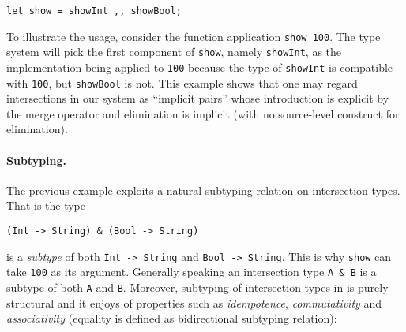 \begin{lstlisting}
let show = showInt ,, showBool;
\end{lstlisting}

To illustrate the usage, consider the function application \lstinline{show 100}.
The type system will pick the first component of \lstinline{show}, namely
\lstinline{showInt}, as the implementation being applied to \lstinline{100}
because the type of \lstinline{showInt} is compatible with \lstinline{100}, but
\lstinline{showBool} is not. This example shows that one may regard
intersections in our system as ``implicit pairs'' whose introduction is explicit
by the merge operator and elimination is implicit (with no source-level
construct for elimination).








\paragraph{Subtyping.} The previous example exploits a natural
subtyping relation on intersection types. That is the type

\begin{lstlisting}
(Int -> String) & (Bool -> String) 
\end{lstlisting}

\noindent is a \emph{subtype} of both \lstinline{Int -> String} and
\lstinline{Bool -> String}. This is why \lstinline{show} can take
\lstinline{100} as its argument. Generally speaking an intersection type
\lstinline{A & B} is a subtype of both \lstinline{A} and \lstinline{B}.
Moreover, subtyping of intersection types in \name is purely structural
and it enjoys of properties such as \emph{idempotence},
\emph{commutativity} and \emph{associativity}
(equality is defined as bidirectional subtyping relation): \\

